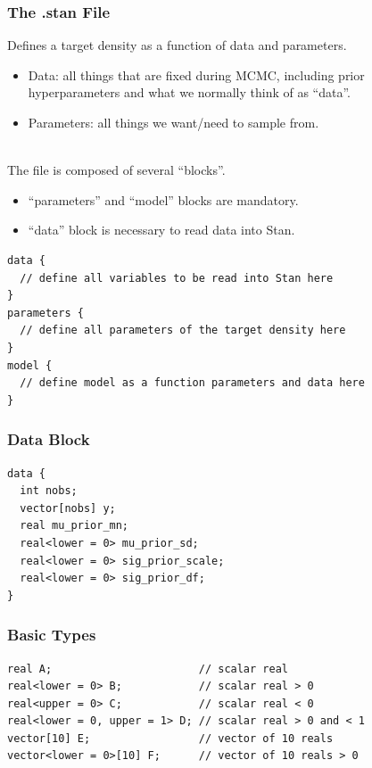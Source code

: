 \documentclass[xcolor=dvipsnames]{beamer}
\begin{document}
\begin{frame}[fragile]
\frametitle{The .stan File}
Defines a target density as a function of data and parameters.
\begin{itemize}
\item Data: all things that are fixed during MCMC, including prior hyperparameters and what we normally think of as ``data''.
\item Parameters: all things we want/need to sample from.\\~\\
\end{itemize}
The file is composed of several ``blocks''. 
\begin{itemize} 
\item ``parameters'' and ``model'' blocks are mandatory. 
\item ``data'' block is necessary to read data into Stan.
\end{itemize}
\begin{verbatim}
data {
  // define all variables to be read into Stan here
}
parameters {
  // define all parameters of the target density here
}
model {
  // define model as a function parameters and data here
}
\end{verbatim}
\end{frame}

\begin{frame}[fragile]
\frametitle{Data Block}
\begin{verbatim}
data {
  int nobs;
  vector[nobs] y;
  real mu_prior_mn;
  real<lower = 0> mu_prior_sd;
  real<lower = 0> sig_prior_scale;
  real<lower = 0> sig_prior_df;
}
\end{verbatim}
\end{frame}

\begin{frame}[fragile]
\frametitle{Basic Types}
\begin{verbatim}
real A;                       // scalar real
real<lower = 0> B;            // scalar real > 0
real<upper = 0> C;            // scalar real < 0
real<lower = 0, upper = 1> D; // scalar real > 0 and < 1
vector[10] E;                 // vector of 10 reals
vector<lower = 0>[10] F;      // vector of 10 reals > 0
\end{verbatim}
\end{frame}
\end{document}
